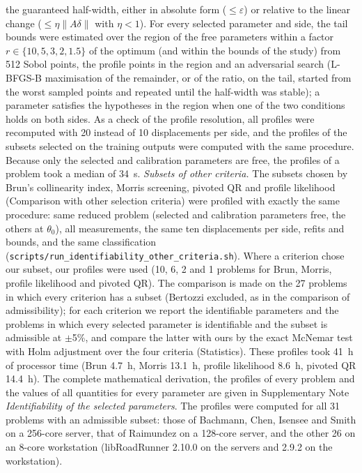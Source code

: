 \documentclass[pdflatex,sn-nature]{sn-jnl}
\theoremstyle{plain}
\begin{document}
the guaranteed half-width, either in absolute form ($\le\varepsilon$) or relative to the linear change ($\le\eta\|A\delta\|$ with $\eta<1$). For every selected parameter and side, the tail bounds were estimated over the region of the free parameters within a factor $r\in\{10,5,3,2,1.5\}$ of the optimum (and within the bounds of the study) from 512 Sobol points, the profile points in the region and an adversarial search (L-BFGS-B maximisation of the remainder, or of the ratio, on the tail, started from the worst sampled points and repeated until the half-width was stable); a parameter satisfies the hypotheses in the region when one of the two conditions holds on both sides. As a check of the profile resolution, all profiles were recomputed with 20 instead of 10 displacements per side, and the profiles of the subsets selected on the training outputs were computed with the same procedure. Because only the selected and calibration parameters are free, the profiles of a problem took a median of 34~s. \label{met:identif-crit}\emph{Subsets of other criteria.} The subsets chosen by Brun's collinearity index, Morris screening, pivoted QR and profile likelihood (Comparison with other selection criteria) were profiled with exactly the same procedure: same reduced problem (selected and calibration parameters free, the others at $\theta_0$), all measurements, the same ten displacements per side, refits and bounds, and the same classification (\texttt{scripts/run\_identifiability\_other\_criteria.sh}). Where a criterion chose our subset, our profiles were used (10, 6, 2 and 1 problems for Brun, Morris, profile likelihood and pivoted QR). The comparison is made on the 27 problems in which every criterion has a subset (Bertozzi excluded, as in the comparison of admissibility); for each criterion we report the identifiable parameters and the problems in which every selected parameter is identifiable and the subset is admissible at $\pm$5\%, and compare the latter with ours by the exact McNemar test with Holm adjustment over the four criteria (Statistics). These profiles took 41~h of processor time (Brun 4.7~h, Morris 13.1~h, profile likelihood 8.6~h, pivoted QR 14.4~h). The complete mathematical derivation, the profiles of every problem and the values of all quantities for every parameter are given in Supplementary Note \textit{Identifiability of the selected parameters}. The profiles were computed for all 31 problems with an admissible subset: those of Bachmann, Chen, Isensee and Smith on a 256-core server, that of Raimundez on a 128-core server, and the other 26 on an 8-core workstation (libRoadRunner 2.10.0 on the servers and 2.9.2 on the workstation).
\end{document}
